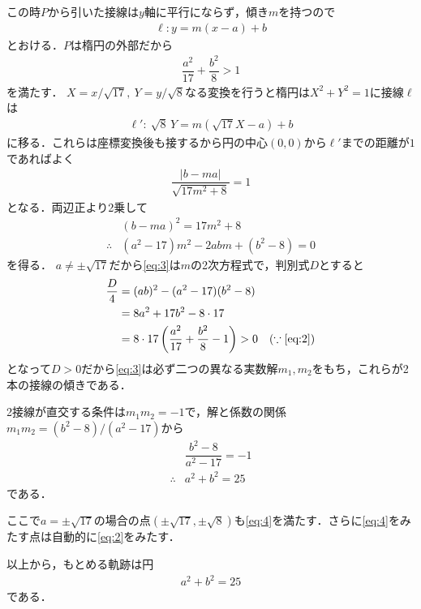 \documentclass[../../main.tex]{subfiles}
\begin{document}
この時$P$から引いた接線は$y$軸に平行にならず，傾き$m$を持つので
\begin{align}
  \ell:y=m(x-a)+b \label{eq:1}
\end{align}
とおける．$P$は楕円の外部だから
\begin{align}
  \dfrac{a^2}{17}+\dfrac{b^2}{8}>1 \label{eq:2}
\end{align}
を満たす．
$X=x/\sqrt{17},\ Y=y/\sqrt{8}$なる変換を行うと楕円は$X^2+Y^2=1$に接線$\ell$は
\begin{align}
  \ell':\ \sqrt{8}\,Y=m(\sqrt{17}X-a)+b
\end{align}
に移る．これらは座標変換後も接するから円の中心$(0,0)$から$\ell'$までの距離が$1$であればよく
\begin{align}
  \dfrac{|b-ma|}{\sqrt{17m^2+8}}=1
\end{align}
となる．両辺正より2乗して
\begin{align}
  &(b-ma)^2=17m^2+8 \\
  \therefore
  &(a^2-17)m^2-2abm+(b^2-8)=0 \label{eq:3}
\end{align}
を得る．
$a\ne\pm\sqrt{17}$だから\cref{eq:3}は$m$の2次方程式で，判別式$D$とすると
\begin{align}
  \dfrac{D}{4}
  &=(ab)^2-(a^2-17)(b^2-8) \\
  &=8a^2+17b^2-8\cdot17 \\
  &=8\cdot 17 \left(\dfrac{a^2}{17}+\dfrac{b^2}{8}-1\right) > 0 \quad (\because \text{\cref{eq:2}})
\end{align}
となって$D>0$だから\cref{eq:3}は必ず二つの異なる実数解$m_1,m_2$をもち，これらが2本の接線の傾きである．

2接線が直交する条件は$m_1m_2=-1$で，解と係数の関係$m_1m_2=(b^2-8)/(a^2-17)$から
\begin{align}
  &\dfrac{b^2-8}{a^2-17}=-1 \\
  \therefore
  &a^2+b^2=25 \label{eq:4}
\end{align}
である．

ここで$a=\pm\sqrt{17}$の場合の点$(\pm\sqrt{17},\pm\sqrt{8})$も\cref{eq:4}を満たす．さらに\cref{eq:4}をみたす点は自動的に\cref{eq:2}をみたす．

以上から，もとめる軌跡は円
\begin{align}
  a^2+b^2=25
\end{align}
である．
\end{document}
